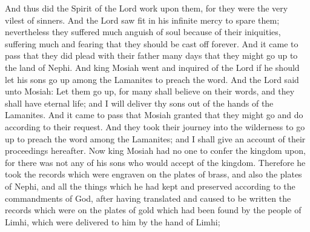 And thus did the Spirit of the Lord work upon them, for they were the very vilest of sinners. And the Lord saw fit in his infinite mercy to spare them; nevertheless they suffered much anguish of soul because of their iniquities, suffering much and fearing that they should be cast off forever.
\bverse \iffalse And it came to pass that they did plead with their father many days that they might go up to the land of Nephi. \fi
And it came to pass that they did plead with their father many days that they might go up to the land of Nephi.
\bverse \iffalse And king Mosiah went and inquired of the Lord if he should let his sons go up among the Lamanites to preach the word. \fi
And king Mosiah went and inquired of the Lord if he should let his sons go up among the Lamanites to preach the word.
\bverse \iffalse And the Lord said unto Mosiah: Let them go up, for many shall believe on their words, and they shall have eternal life; and I will deliver thy sons out of the hands of the Lamanites. \fi
And the Lord said unto Mosiah: Let them go up, for many shall believe on their words, and they shall have eternal life; and I will deliver thy sons out of the hands of the Lamanites.
\bverse \iffalse And it came to pass that Mosiah granted that they might go and do according to their request. \fi
And it came to pass that Mosiah granted that they might go and do according to their request.
\bverse \iffalse And they took their journey into the wilderness to go up to preach the word among the Lamanites; and I shall give an account of their proceedings hereafter. \fi
And they took their journey into the wilderness to go up to preach the word among the Lamanites; and I shall give an account of their proceedings hereafter.
\bverse \iffalse Now king Mosiah had no one to confer the kingdom upon, for there was not any of his sons who would accept of the kingdom. \fi
Now king Mosiah had no one to confer the kingdom upon, for there was not any of his sons who would accept of the kingdom.
\bverse \iffalse Therefore he took the records which were engraven on the plates of brass, and also the plates of Nephi, and all the things which he had kept and preserved according to the commandments of God, after having translated and caused to be written the records which were on the plates of gold which had been found by the people of Limhi, which were delivered to him by the hand of Limhi; \fi
Therefore he took the records which were engraven on the plates of brass, and also the plates of Nephi, and all the things which he had kept and preserved according to the commandments of God, after having translated and caused to be written the records which were on the plates of gold which had been found by the people of Limhi, which were delivered to him by the hand of Limhi;
